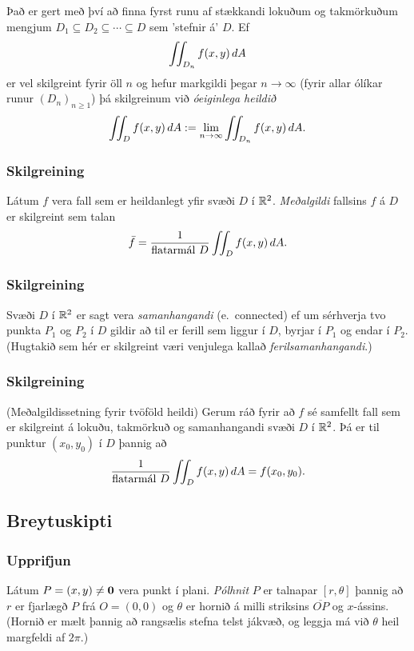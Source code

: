 \medskip
Það er gert með því að finna fyrst runu af stækkandi lokuðum og takmörkuðum mengjum $D_1 \subseteq D_2 \subseteq \cdots \subseteq D$ sem 'stefnir á' $D$. Ef
\begin {equation*}
\int\!\!\!\int_{D_n} f(x,y)\,dA
\end {equation*}
er vel skilgreint fyrir öll $n$ og hefur markgildi þegar $n\to \infty$ (fyrir allar ólíkar runur $(D_n)_{n\geq 1}$) þá 
skilgreinum við \emph{óeiginlega heildið}
\begin {equation*}
 \int\!\!\!\int_{D} f(x,y)\,dA := \lim_{n\to \infty} \int\!\!\!\int_{D_n} f(x,y)\,dA .
\end {equation*}





\subsubsection{Skilgreining }
 Látum $f$ vera fall sem er heildanlegt yfir svæði $D$ í ${\mathbb R}^2$.  {\em Meðalgildi} fallsins $f$ á $D$ er skilgreint sem talan 
$$\bar{f}=\frac{1}{\mbox{flatarmál }D}\int\!\!\!\int_D f(x,y)\,dA.$$ 




\subsubsection{Skilgreining }
Svæði $D$ í ${\mathbb R}^2$ er sagt vera {\em
  samanhangandi} (e.~connected) ef um sérhverja tvo punkta $P_1$ og $P_2$ í $D$
gildir að til er ferill sem liggur í $D$, byrjar í $P_1$ og endar í
$P_2$.  (Hugtakið sem hér er skilgreint væri venjulega kallað {\em
  ferilsamanhangandi}.) 



\subsubsection{Skilgreining }
(Meðalgildissetning fyrir tvöföld heildi)
Gerum ráð fyrir að $f$ sé samfellt fall sem er skilgreint á lokuðu, takmörkuð og samanhangandi svæði $D$ í ${\mathbb R}^2$.   Þá er til punktur $(x_0,y_0)$ í $D$ þannig að 
$$\frac{1}{\mbox{flatarmál }D}\int\!\!\!\int_D f(x,y)\,dA=f(x_0,y_0).$$




\subsection{Breytuskipti} 

\subsubsection{Upprifjun }
 Látum $P=(x,y)\neq \mbox{${\bf 0}$}$ vera punkt í plani.  {\em
  Pólhnit} $P$ er talnapar $[r,\theta]$ þannig að $r$ er fjarlægð $P$
frá 
$O=(0,0)$ og $\theta$ er hornið á milli striksins $\overline{OP}$ og
  $x$-ássins.  (Hornið er mælt þannig að rangsælis stefna telst
  jákvæð, og leggja má við $\theta$ heil margfeldi af $2\pi$.) 



